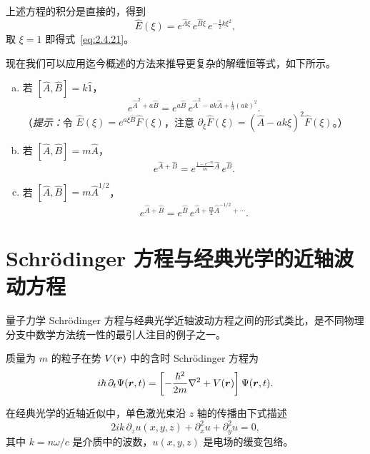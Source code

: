 上述方程的积分是直接的，得到
\begin{equation}
\hat{E}(\xi)=e^{\hat{A}\xi}\,e^{\hat{B}\xi}\,e^{-\frac{1}{2}k\xi^{2}},
\label{eq:2.4.32}
\end{equation}
取 $\xi=1$ 即得式~\eqref{eq:2.4.21}。

现在我们可以应用迄今概述的方法来推导更复杂的解缠恒等式，如下所示。

\begin{enumerate}[(a)]
\item 若 $[\hat{A},\hat{B}]=k\hat{1}$，
\begin{equation}
e^{\hat{A}^{2}+a\hat{B}}
=e^{a\hat{B}}\,e^{\hat{A}^{2}-a k\hat{A}+\frac{1}{3}(a k)^{2}}.
\label{eq:2.4.33}
\end{equation}
（\textit{提示：}令 $\hat{E}(\xi)=e^{a\xi\hat{B}}\hat{F}(\xi)$，注意
$\partial_{\xi}\hat{F}(\xi)=(\hat{A}-ak\xi)^{2}\hat{F}(\xi)$。）

\item 若 $[\hat{A},\hat{B}]=m\hat{A}$，
\begin{equation}
e^{\hat{A}+\hat{B}}
=e^{\frac{1-e^{-m}}{m}\hat{A}}\,e^{\hat{B}}.
\label{eq:2.4.34}
\end{equation}

\item 若 $[\hat{A},\hat{B}]=m\hat{A}^{1/2}$，
\begin{equation}
e^{\hat{A}+\hat{B}}
=e^{\hat{B}}\,e^{\hat{A}+\frac{m}{2}\hat{A}^{-1/2}+\cdots}.
\end{equation}
\end{enumerate}

\section{Schr\"odinger 方程与经典光学的近轴波动方程}

量子力学 Schr\"odinger 方程与经典光学近轴波动方程之间的形式类比，是不同物理分支中数学方法统一性的最引人注目的例子之一。

质量为 $m$ 的粒子在势 $V(\bm{r})$ 中的含时 Schr\"odinger 方程为
\begin{equation}
i\hbar\,\partial_{t}\Psi(\bm{r},t)
=\left[-\frac{\hbar^{2}}{2m}\nabla^{2}+V(\bm{r})\right]\Psi(\bm{r},t).
\label{eq:2.5.1}
\end{equation}

在经典光学的近轴近似中，单色激光束沿 $z$ 轴的传播由下式描述
\begin{equation}
2ik\,\partial_{z}u(x,y,z)+\partial_{x}^{2}u+\partial_{y}^{2}u=0,
\label{eq:2.5.2}
\end{equation}
其中 $k=n\omega/c$ 是介质中的波数，$u(x,y,z)$ 是电场的缓变包络。

